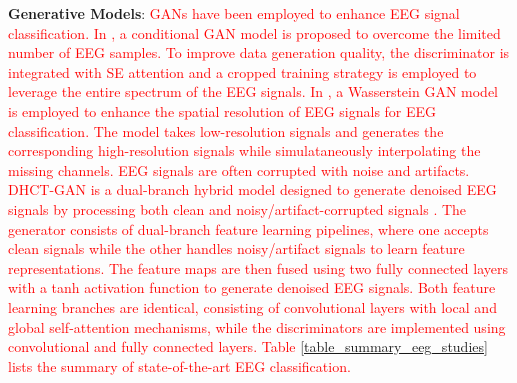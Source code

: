 \documentclass[preprint,12pt]{elsarticle}
\begin{document}
\textbf{Generative Models}: \textcolor{red}{GANs have been employed to enhance EEG signal classification. In \citep{song_eeggan-net_2024}, a conditional GAN model is proposed  to overcome the limited number of EEG samples. To improve data generation quality, the discriminator is integrated with SE attention and a cropped training strategy is employed to leverage the entire spectrum of the EEG signals. In \citep{corley_deep_2025}, a Wasserstein GAN model is employed to enhance the spatial resolution of EEG signals for EEG classification. The model takes low-resolution signals and generates the corresponding high-resolution signals while simulataneously interpolating the missing channels. EEG signals are often corrupted with noise and artifacts. DHCT-GAN is a dual-branch hybrid model designed to generate denoised EEG signals by processing both clean and noisy/artifact-corrupted signals \citep{cai_dhct-gan_2025}. The generator consists of dual-branch feature learning pipelines, where one accepts clean signals while the other handles noisy/artifact signals to learn feature representations. The feature maps are then fused using two fully connected layers with a tanh activation function to generate denoised EEG signals. Both feature learning branches are identical, consisting of convolutional layers with local and global self-attention mechanisms, while the discriminators are implemented using convolutional and fully connected layers. Table \ref{table_summary_eeg_studies} lists the summary of state-of-the-art EEG classification.}
\end{document}
